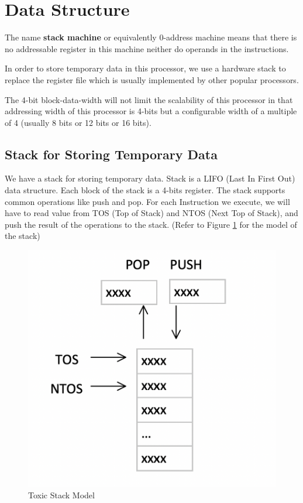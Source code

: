 \documentclass[11pt]{report}
\begin{document}
    \section{Data Structure}
    The name \textbf{stack machine} or equivalently 0-address machine means that 
    there is no addressable register in this machine neither do operands in the instructions. \par
    
    In order to store temporary data in this processor, we use a hardware stack to replace 
    the register file which is usually implemented by other popular processors. \par

    The 4-bit block-data-width will not limit the scalability of this processor in that addressing
    width of this processor is 4-bits but a configurable width of a multiple of 4 
    (usually 8 bits or 12 bits or 16 bits).

    \subsection{Stack for Storing Temporary Data}
    We have a stack for storing temporary data. 
    Stack is a LIFO (Last In First Out) data structure.
    Each block of the stack is a 4-bits register.
    The stack supports common operations like push and pop. For each Instruction we execute,
    we will have to read value from TOS (Top of Stack) and NTOS (Next Top of Stack), 
    and push the result of the operations to the stack.
    (Refer to Figure \ref{figure:stack_model} for the model of the stack)
    \begin{figure}[h!]
        \centering
        \includegraphics[scale=0.6]{Toxic_Stack_Model.png}
        \caption{Toxic Stack Model}
        \label{figure:stack_model}
    \end{figure}
\end{document}
